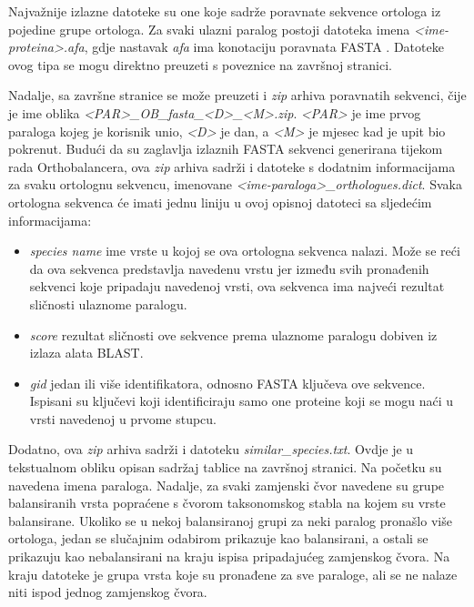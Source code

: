 Najvažnije izlazne datoteke su one koje sadrže poravnate sekvence ortologa iz
pojedine grupe ortologa. Za svaki ulazni paralog postoji datoteka imena
\emph{<ime-proteina>.afa}, gdje nastavak \emph{afa} ima konotaciju poravnata
FASTA . Datoteke ovog tipa se mogu direktno preuzeti s
poveznice na završnoj stranici.

Nadalje, sa završne stranice se može preuzeti i \emph{zip} arhiva poravnatih
sekvenci, čije je ime oblika \emph{<PAR>\_OB\_fasta\_<D>\_<M>.zip}. \emph{<PAR>}
je ime prvog paraloga kojeg je korisnik unio, \emph{<D>} je dan, a \emph{<M>} je
mjesec kad je upit bio pokrenut. Budući da su zaglavlja izlaznih FASTA
sekvenci generirana tijekom rada Orthobalancera, ova \emph{zip} arhiva sadrži i
datoteke s dodatnim informacijama za svaku ortolognu sekvencu, imenovane
\emph{<ime-paraloga>\_orthologues.dict}. Svaka ortologna sekvenca će imati jednu
liniju u ovoj opisnoj datoteci sa sljedećim informacijama:

\begin{itemize}

    \item \emph{species name} ime vrste u kojoj se ova ortologna sekvenca
nalazi. Može se reći da ova sekvenca predstavlja navedenu vrstu jer između svih
pronađenih sekvenci koje pripadaju navedenoj vrsti, ova sekvenca ima najveći
rezultat sličnosti ulaznome paralogu.

    \item \emph{score} rezultat sličnosti ove sekvence prema ulaznome paralogu
dobiven iz izlaza alata BLAST.

    \item \emph{gid} jedan ili više identifikatora, odnosno FASTA ključeva ove
sekvence. Ispisani su ključevi koji identificiraju samo one proteine koji se
mogu naći u vrsti navedenoj u prvome stupcu.

\end{itemize}
Dodatno, ova \emph{zip} arhiva sadrži i datoteku \emph{similar\_species.txt}.
Ovdje je u tekstualnom obliku opisan sadržaj tablice na završnoj stranici. Na
početku su navedena imena paraloga. Nadalje, za svaki zamjenski čvor navedene su
grupe balansiranih vrsta popraćene s čvorom taksonomskog stabla na kojem su
vrste balansirane. Ukoliko se u nekoj balansiranoj grupi za neki paralog
pronašlo više ortologa, jedan se slučajnim odabirom prikazuje kao balansirani, a
ostali se prikazuju kao nebalansirani  na kraju ispisa
pripadajućeg zamjenskog čvora. Na kraju datoteke je grupa vrsta koje su
pronađene za sve paraloge, ali se ne nalaze niti ispod jednog zamjenskog čvora.

